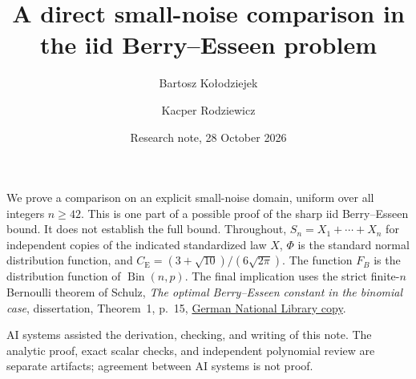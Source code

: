 \documentclass[11pt]{article}
\title{A direct small-noise comparison in the iid Berry--Esseen problem}
\author{Bartosz Ko{\l}odziejek \and Kacper Rodziewicz}
\date{Research note, 28 October 2026}
\newcommand{\CE}{C_{\mathrm E}}
\begin{document}
\maketitle
\noindent
We prove a comparison on an explicit small-noise domain, uniform over all
integers \(n\ge42\). This is one part of a possible proof of the sharp iid
Berry--Esseen bound. It does not establish the full bound.
Throughout, \(S_n=X_1+\cdots+X_n\) for independent copies of the indicated
standardized law \(X\), \(\Phi\) is the standard normal distribution
function, and
\(\CE=(3+\sqrt{10})/(6\sqrt{2\pi})\).
The function \(F_B\) is the distribution function of \(\operatorname{Bin}(n,p)\).
The final implication uses the strict finite-\(n\) Bernoulli theorem of
Schulz, \emph{The optimal Berry--Esseen constant in the binomial case},
dissertation, Theorem~1, p.~15,
\href{https://d-nb.info/1197702695/34}{German National Library copy}.
\par\medskip
\noindent
AI systems assisted the derivation, checking, and writing of this note.
The analytic proof, exact scalar checks, and independent polynomial review
are separate artifacts; agreement between AI systems is not proof.

\end{document}
